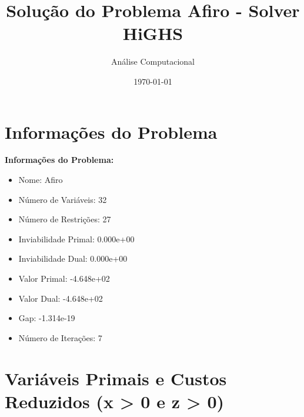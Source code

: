 \documentclass[12pt]{article}
\title{Solução do Problema Afiro - Solver HiGHS}
\author{Análise Computacional}
\date{\today}
\begin{document}
\maketitle

\section{Informações do Problema}

\textbf{Informações do Problema:}
\begin{itemize}
\item Nome: Afiro
\item Número de Variáveis: 32
\item Número de Restrições: 27
\item Inviabilidade Primal: 0.000e+00
\item Inviabilidade Dual: 0.000e+00
\item Valor Primal: -4.648e+02
\item Valor Dual: -4.648e+02
\item Gap: -1.314e-19
\item Número de Iterações: 7
\end{itemize}


\section{Variáveis Primais e Custos Reduzidos (x > 0 e z > 0)}
\end{document}
